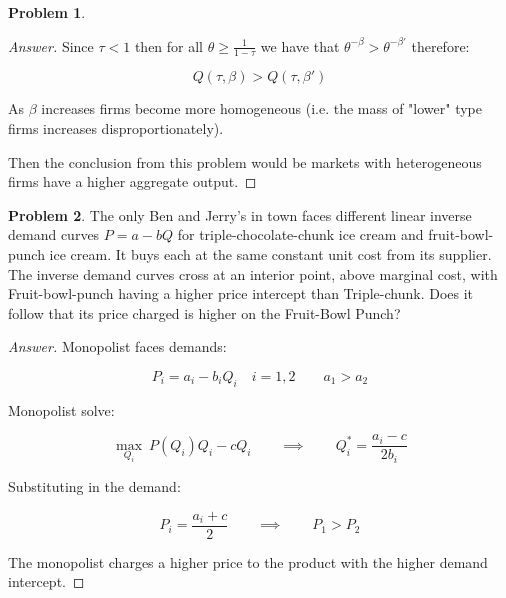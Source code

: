\documentclass[12pt]{article}
\theoremstyle{definition}
\newtheorem{problem}{Problem}
\newcommand{\qiq}{\qquad \implies \qquad}
\begin{document}
\begin{problem}
\begin{proof}[Answer]
Since $\tau < 1$ then for all $\theta \geq \frac{1}{1-\tau}$ we have that  $\theta^{-\beta}>\theta^{-\beta'}$ therefore:

$$Q(\tau, \beta) > Q(\tau, \beta')$$

As $\beta$ increases firms become more homogeneous (i.e. the mass of "lower" type firms increases disproportionately).



Then the conclusion from this problem would be markets with heterogeneous firms have a higher aggregate output. 

\end{proof}
\end{problem}

\begin{problem}
The only Ben and Jerry's in town faces different linear inverse demand curves $P=a-b Q$ for triple-chocolate-chunk ice cream and fruit-bowl-punch ice cream. It buys each at the same constant unit cost from its supplier. The inverse demand curves cross at an interior point, above marginal cost, with Fruit-bowl-punch having a higher price intercept than Triple-chunk. Does it follow that its price charged is higher on the Fruit-Bowl Punch?
\end{problem}

\begin{proof}[Answer]

Monopolist faces demands:

$$P_i = a_i - b_iQ_i\quad i = 1,2 \qquad a_1 > a_2$$

Monopolist solve:

$$\max_{Q_i}\: P(Q_i)Q_i - cQ_i \qiq Q_i^* = \frac{a_i-c}{2b_i}$$

Substituting in the demand:

$$P_i = \frac{a_i+c}{2} \qiq P_1 > P_2$$

The monopolist charges a higher price to the product with the higher demand intercept.

\end{proof}
\end{document}
